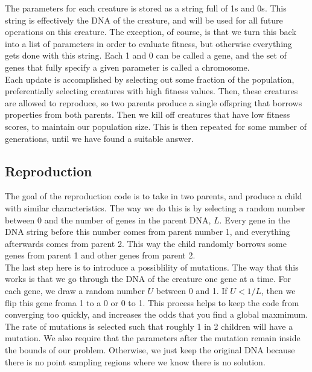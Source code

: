 \documentclass[twocolumn]{aastex63}
\begin{document}
The parameters for each creature is stored as a string full of 1s and 0s. This string is effectively the DNA of the creature, and will be used for all future operations on this creature. The exception, of course, is that we turn this back into a list of parameters in order to evaluate fitness, but otherwise everything gets done with this string. Each 1 and 0 can be called a gene, and the set of genes that fully specify a given parameter is called a chromosome.\\

Each update is accomplished by selecting out some fraction of the population, preferentially selecting creatures with high fitness values. Then, these creatures are allowed to reproduce, so two parents produce a single offspring that borrows properties from both parents. Then we kill off creatures that have low fitness scores, to maintain our population size. This is then repeated for some number of generations, until we have found a suitable answer.\\

\subsection{Reproduction}

The goal of the reproduction code is to take in two parents, and produce a child with similar characteristics. The way we do this is by selecting a random number between 0 and the number of genes in the parent DNA, $L$. Every gene in the DNA string before this number comes from parent number 1, and everything afterwards comes from parent 2. This way the child randomly borrows some genes from parent 1 and other genes from parent 2.\\

The last step here is to introduce a possiblility of mutations. The way that this works is that we go through the DNA of the creature one gene at a time. For each gene, we draw a random number $U$ between 0 and 1. If $U < 1 / L$, then we flip this gene froma 1 to a 0 or 0 to 1. This process helps to keep the code from converging too quickly, and increases the odds that you find a global maxmimum. The rate of mutations is selected such that roughly 1 in 2 children will have a mutation. We also require that the parameters after the mutation remain inside the bounds of our problem. Otherwise, we just keep the original DNA because there is no point sampling regions where we know there is no solution. \\
\end{document}
